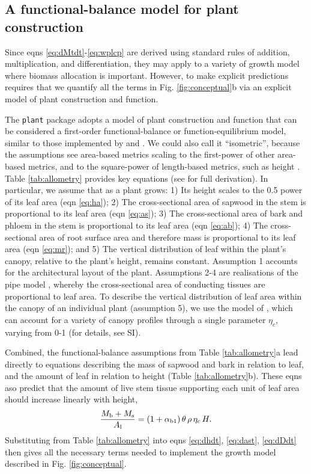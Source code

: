 \documentclass[9pt,twocolumn,twoside,lineno]{pnas-new}
\newcommand{\plant}{\texttt{plant}}
\begin{document}
\subsection{A functional-balance model for plant construction}

Since eqns \ref{eq:dMtdt}-\ref{eq:wplcp} are derived using standard rules of addition, multiplication, and differentiation, they may apply to a variety of growth model where biomass allocation is important. However, to make explicit predictions requires that we quantify all the terms in Fig. \ref{fig:conceptual}b via an explicit model of plant construction and function.

The {\plant} package adopts a model of plant construction and function that can be considered a first-order functional-balance or function-equilibrium model, similar to those implemented by \citep{Makela-1997} and \citep{Moorcroft-2001}. We could also call it ``isometric'', because the assumptions see area-based metrics scaling to the first-power of other area-based metrics, and to the square-power of length-based metrics, such as height \citep{Huxley-1932}. Table \ref{tab:allometry} provides key equations (see \citep{Falster-2016} for full derivation). In particular, we assume that as a plant grows:
1) Its height scales to the 0.5 power of its leaf area (eqn \ref{eq:ha});
2) The cross-sectional area of sapwood in the stem is proportional to its leaf area (eqn \ref{eq:as});
3) The cross-sectional area of bark and phloem in the stem  is proportional to its leaf area (eqn \ref{eq:ab});
4) The cross-sectional area of root surface area and therefore mass is proportional to its leaf area (eqn \ref{eq:mr}); and
5) The vertical distribution of leaf within the plant's canopy, relative to the plant's height, remains constant.
Assumption 1 accounts for the architectural layout of the plant. Assumptions 2-4 are realisations of the pipe model \citep{Shinozaki-1964}, whereby the cross-sectional area of conducting tissues are proportional to leaf area. To describe the vertical distribution of leaf area within the canopy of an individual plant (assumption 5), we use the model of \citep{Yokozawa-1995}, which can account for a variety of canopy profiles through a single parameter $\eta_c$, varying from 0-1 (for details, see SI).

Combined, the functional-balance assumptions from Table \ref{tab:allometry}a lead directly to equations describing the mass of sapwood and bark in relation to leaf, and the amount of leaf in relation to height (Table \ref{tab:allometry}b). These eqns aso predict that the amount of live stem tissue supporting each unit of leaf area should increase linearly with height,
\begin{equation}\label{eq:msml}
\frac{M_{\rm b} + M_{\rm s}}{A_{\rm l}} = (1+ \alpha_{\rm b1}) \,\theta \, \rho \, \eta_c \, H.
\end{equation}
Substituting from Table \ref{tab:allometry} into eqns \ref{eq:dhdt}, \ref{eq:dast}, \ref{eq:dDdt} then gives all the necessary terms needed to implement the growth model described in Fig. \ref{fig:conceptual}. 
\end{document}
